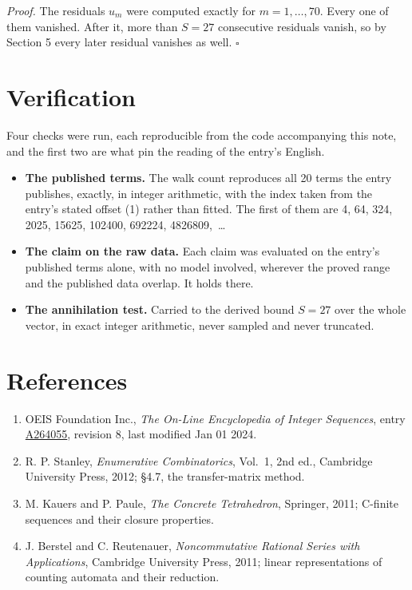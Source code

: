 \documentclass[11pt]{article}
\theoremstyle{definition}
\begin{document}
{\itshape Proof.} The residuals $u_m$ were computed exactly for $m = 1,\dots,70$. Every one of them vanished. After it, more than $S = 27$ consecutive residuals vanish, so by Section 5 every later residual vanishes as well. $\square$

\section{Verification}

Four checks were run, each reproducible from the code accompanying this note, and the first two are what pin the reading of the entry's English.

\begin{itemize}

\item {\bfseries The published terms.} The walk count reproduces all 20 terms the entry publishes, exactly, in integer arithmetic, with the index taken from the entry's stated offset (1) rather than fitted. The first of them are 4, 64, 324, 2025, 15625, 102400, 692224, 4826809,~\dots

\item {\bfseries The claim on the raw data.} Each claim was evaluated on the entry's published terms alone, with no model involved, wherever the proved range and the published data overlap. It holds there.

\item {\bfseries The annihilation test.} Carried to the derived bound $S = 27$ over the whole vector, in exact integer arithmetic, never sampled and never truncated.

\end{itemize}

\section{References}

\begin{enumerate}

\item OEIS Foundation Inc., \emph{The On-Line Encyclopedia of Integer Sequences}, entry \href{https://oeis.org/A264055}{A264055}, revision 8, last modified Jan 01 2024.

\item R. P. Stanley, \emph{Enumerative Combinatorics}, Vol.~1, 2nd ed., Cambridge University Press, 2012; \S4.7, the transfer-matrix method.

\item M. Kauers and P. Paule, \emph{The Concrete Tetrahedron}, Springer, 2011; C-finite sequences and their closure properties.

\item J. Berstel and C. Reutenauer, \emph{Noncommutative Rational Series with Applications}, Cambridge University Press, 2011; linear representations of counting automata and their reduction.

\end{enumerate}
\end{document}
